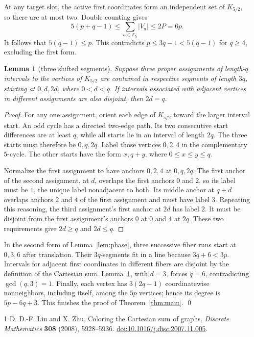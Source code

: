 \documentclass[11pt]{article}
\newtheorem{lemma}[theorem]{Lemma}
\newcommand{\Z}{\mathbb Z}
\begin{document}
At any target slot, the active first coordinates form an independent
set of $K_{5/2}$, so there are at most two. Double counting gives
\[
  5(p+q-1)\leq\sum_{a\in\Z_5}|V_a|\leq2P=6p.
\]
It follows that $5(q-1)\leq p$. This contradicts
$p\leq3q-1<5(q-1)$ for $q\geq4$, excluding the first form.

\begin{lemma}[three shifted segments]\label{lem:segments}
Suppose three proper assignments of length-$q$ intervals to the
vertices of $K_{5/2}$ are contained in respective segments of length
$3q$, starting at $0,d,2d$, where $0<d<q$.  If intervals associated
with adjacent vertices in different assignments are also disjoint,
then $2d=q$.
\end{lemma}
\begin{proof}
For any one assignment, orient each edge of $K_{5/2}$ toward the
larger interval start.  An odd cycle has a directed two-edge path.
Its two consecutive start differences are at least $q$, while all
starts lie in an interval of length $2q$.  The three starts must
therefore be $0,q,2q$.  Label those vertices $0,2,4$ in the
complementary $5$-cycle.  The other starts have the form $x,q+y$,
where $0\leq x\leq y\leq q$.

Normalize the first assignment to have anchors $0,2,4$ at
$0,q,2q$.  The first anchor of the second assignment, at $d$,
overlaps the first anchors $0$ and $2$, so its label must be $1$,
the unique label nonadjacent to both.  Its middle anchor at $q+d$
overlaps anchors $2$ and $4$ of the first assignment and must
have label $3$.  Repeating this reasoning, the third assignment's
first anchor at $2d$ has label $2$.  It must be disjoint from the
first assignment's anchors $0$ at $0$ and $4$ at $2q$.
These two requirements give $2d\geq q$ and $2d\leq q$.
\end{proof}

In the second form of Lemma~\ref{lem:phase}, three successive fiber
runs start at $0,3,6$ after translation.  Their $3q$-segments fit
in a line because $3q+6<3p$.  Intervals for adjacent first
coordinates in different fibers are disjoint by the definition of
the Cartesian sum.  Lemma~\ref{lem:segments}, with $d=3$, forces
$q=6$, contradicting $\gcd(q,3)=1$.  Finally, each vertex has
$3(2q-1)$ coordinatewise nonneighbors, including itself, among the
$5p$ vertices; hence its degree is $5p-6q+3$.  This finishes the proof
of Theorem~\ref{thm:main}. \qed

\begin{thebibliography}{1}
D. D.-F. Liu and X. Zhu, Coloring the Cartesian sum of graphs,
\emph{Discrete Mathematics} \textbf{308} (2008), 5928--5936.
\href{https://doi.org/10.1016/j.disc.2007.11.005}{doi:10.1016/j.disc.2007.11.005}.
\end{thebibliography}
\end{document}
